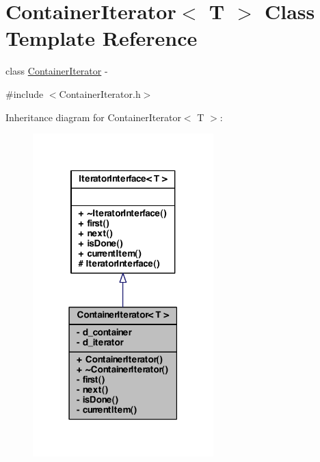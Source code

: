 \hypertarget{class_container_iterator}{
\section{ContainerIterator$<$ T $>$ Class Template Reference}
\label{class_container_iterator}
}


class \hyperlink{class_container_iterator}{ContainerIterator} -\/  




{\ttfamily \#include $<$ContainerIterator.h$>$}



Inheritance diagram for ContainerIterator$<$ T $>$:
\nopagebreak
\begin{figure}[H]
\begin{center}
\leavevmode
\includegraphics[width=198pt]{class_container_iterator__inherit__graph}
\end{center}
\end{figure}



